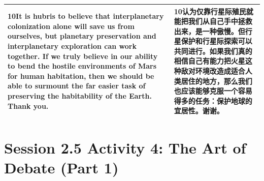 \documentclass[UTF8,zihao=-4,fontset=fandol]{ctexart}
\newcommand{\TranscriptColumn}{\raggedright\arraybackslash\hyphenpenalty=10000\exhyphenpenalty=10000\sloppy}
\begin{document}
\begin{longtable}{>{\TranscriptColumn}p{} >{\TranscriptColumn}p{}}
\textbf{10}\quad It is hubris to believe that interplanetary colonization alone will save us from ourselves, but planetary preservation and interplanetary exploration can work together. If we truly believe in our ability to bend the hostile environments of Mars for human habitation, then we should be able to surmount the far easier task of preserving the habitability of the Earth. Thank you. & \textbf{10}\quad 认为仅靠行星际殖民就能把我们从自己手中拯救出来，是一种傲慢。但行星保护和行星际探索可以共同进行。如果我们真的相信自己有能力把火星这种敌对环境改造成适合人类居住的地方，那么我们也应该能够克服一个容易得多的任务：保护地球的宜居性。谢谢。 \\ \hline
\end{longtable}


\clearpage
\section{Session 2.5 Activity 4: The Art of Debate (Part 1)}
\end{document}
